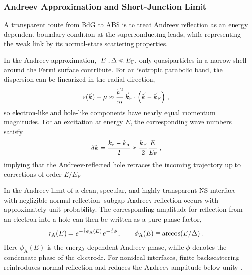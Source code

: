         \subsubsection*{Andreev Approximation and Short-Junction Limit}

            A transparent route from BdG to ABS is to treat Andreev reflection as an energy dependent boundary condition at the superconducting leads, while representing the weak link by its normal-state scattering properties.

            In the Andreev approximation, $|E|,\Delta\sll E_\mathrm{F}$, only quasiparticles in a narrow shell around the Fermi surface contribute. For an isotropic parabolic band, the dispersion can be linearized in the radial direction,
            \begin{equation}
                \varepsilon(\vec{k})-\mu \sapprox \frac{\hbar^2}{m}\,\vec{k}_\mathrm{F}\cdot\left(\vec{k}-\vec{k}_\mathrm{F}\right)\,,
            \end{equation}
            so electron-like and hole-like components have nearly equal momentum magnitudes. For an excitation at energy $E$, the corresponding wave numbers satisfy
            \begin{equation}
                \delta k = \frac{k_\mathrm{e} - k_\mathrm{h}}{2} \sapprox \frac{k_\mathrm{F}}{2}\frac{E}{E_\mathrm{F}}\,,
            \end{equation}
            implying that the Andreev-reflected hole retraces the incoming trajectory up to corrections of order $E/E_\mathrm{F}$ \cite{andreev_thermal_1964,de_gennes_superconductivity_1966}.

            In the Andreev limit of a clean, specular, and highly transparent NS interface with negligible normal reflection, subgap Andreev reflection occurs with approximately unit probability. The corresponding amplitude for reflection from an electron into a hole can then be written as a pure phase factor,
            \begin{equation}
                r_\mathrm{A}(E) = e^{-\ima\phi_\mathrm{A}(E)}\,e^{-\ima\phi}\,,\qquad
                \phi_\mathrm{A}(E)\sequiv\arccos\!\left(E/\Delta\right)\,.
            \end{equation}
            Here $\phi_\mathrm{A}(E)$ is the energy dependent Andreev phase, while $\phi$ denotes the condensate phase of the electrode. For nonideal interfaces, finite backscattering reintroduces normal reflection and reduces the Andreev amplitude below unity \cite{andreev_thermal_1964,beenakker_quantum_1992}.

